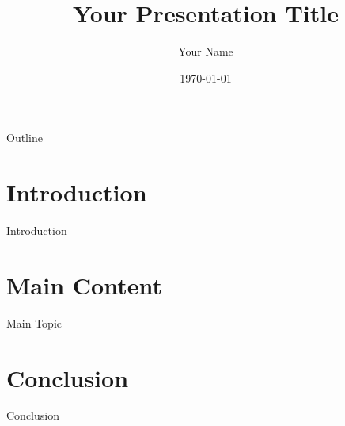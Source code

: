 \documentclass{beamer}
\title{Your Presentation Title}
\author{Your Name}
\institute{Your Institute}
\date{\today}
\begin{document}
\begin{frame}
    \titlepage
\end{frame}

\begin{frame}{Outline}
    \tableofcontents
\end{frame}

\section{Introduction}
\begin{frame}{Introduction}
\end{frame}

\section{Main Content}
\begin{frame}{Main Topic}
\end{frame}

\section{Conclusion}
\begin{frame}{Conclusion}
\end{frame}
\end{document}
